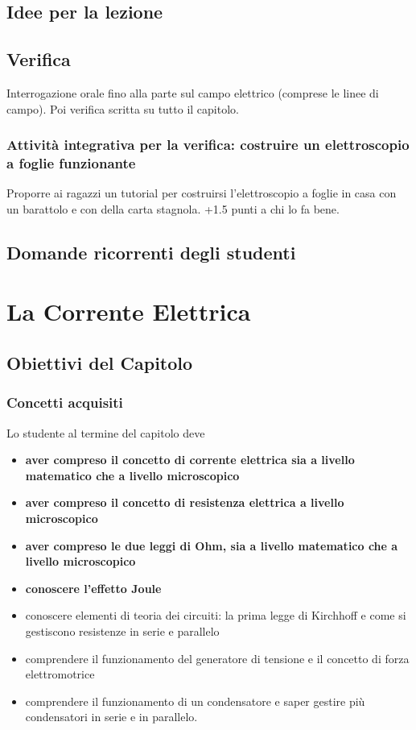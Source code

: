 \documentclass[11pt]{report}
\begin{document}
\section*{Idee per la lezione}


\section*{Verifica}
Interrogazione orale fino alla parte sul campo elettrico (comprese le linee di campo). Poi verifica scritta su tutto il capitolo.

\subsection*{Attività integrativa per la verifica: costruire un elettroscopio a foglie funzionante}
Proporre ai ragazzi un tutorial per costruirsi l'elettroscopio a foglie in casa con un barattolo e con della carta stagnola. +1.5 punti a chi lo fa bene.

\section*{Domande ricorrenti degli studenti}

\chapter{La Corrente Elettrica}

\section*{Obiettivi del Capitolo}

\subsection*{Concetti acquisiti}

Lo studente al termine del capitolo deve
\begin{itemize}
    \item \textbf{aver compreso il concetto di corrente elettrica sia a livello matematico che a livello microscopico}
    \item \textbf{aver compreso il concetto di resistenza elettrica a livello microscopico}
    \item \textbf{aver compreso le due leggi di Ohm, sia a livello matematico che a livello microscopico}
    \item \textbf{conoscere l'effetto Joule}
    \item conoscere elementi di teoria dei circuiti: la prima legge di Kirchhoff e come si gestiscono resistenze in serie e parallelo
    \item comprendere il funzionamento del generatore di tensione e il concetto di forza elettromotrice
    \item comprendere il funzionamento di un condensatore e saper gestire più condensatori in serie e in parallelo.
\end{itemize}
\end{document}
